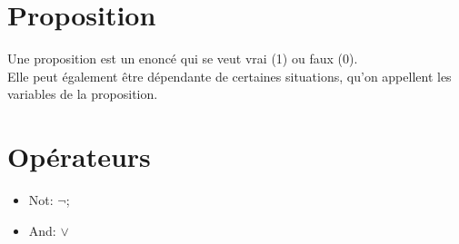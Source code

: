 \documentclass{article}
\title{}
\author{Eyal Shukrun}
\begin{document}
\maketitle

 \section{Proposition}
 Une proposition est un enoncé qui se veut vrai (1) ou faux (0).\\
 Elle peut également être dépendante de certaines situations, qu'on appellent les variables de la proposition.\\
 
 \section{Opérateurs}
 \begin{itemize}
   \item Not: $\neg$;
   \item And: $\vee$
 \end{itemize}

 
\end{document}
